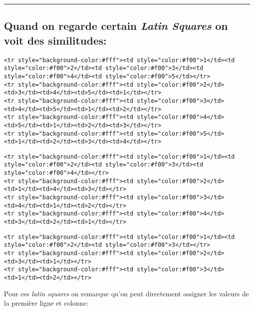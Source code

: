 \documentclass[11pt]{article}
\begin{document}
    \begin{center}\rule{0.5\linewidth}{\linethickness}\end{center}

    \subsection{\texorpdfstring{Quand on regarde certain \emph{Latin
Squares} on voit des
similitudes:}{Quand on regarde certain Latin Squares on voit des similitudes:}}\label{quand-on-regarde-certain-latin-squares-on-voit-des-similitudes}

    \begin{verbatim}
<tr style="background-color:#fff"><td style="color:#f00">1</td><td style="color:#f00">2</td><td style="color:#f00">3</td><td style="color:#f00">4</td><td style="color:#f00">5</td></tr>
<tr style="background-color:#fff"><td style="color:#f00">2</td><td>3</td><td>4</td><td>5</td><td>1</td></tr>
<tr style="background-color:#fff"><td style="color:#f00">3</td><td>4</td><td>5</td><td>1</td><td>2</td></tr>
<tr style="background-color:#fff"><td style="color:#f00">4</td><td>5</td><td>1</td><td>2</td><td>3</td></tr>
<tr style="background-color:#fff"><td style="color:#f00">5</td><td>1</td><td>2</td><td>3</td><td>4</td></tr>
\end{verbatim}

    \begin{verbatim}
<tr style="background-color:#fff"><td style="color:#f00">1</td><td style="color:#f00">2</td><td style="color:#f00">3</td><td style="color:#f00">4</td></tr>
<tr style="background-color:#fff"><td style="color:#f00">2</td><td>1</td><td>4</td><td>3</td></tr>
<tr style="background-color:#fff"><td style="color:#f00">3</td><td>4</td><td>1</td><td>2</td></tr>
<tr style="background-color:#fff"><td style="color:#f00">4</td><td>3</td><td>2</td><td>1</td></tr>
\end{verbatim}

    \begin{verbatim}
<tr style="background-color:#fff"><td style="color:#f00">1</td><td style="color:#f00">2</td><td style="color:#f00">3</td></tr>
<tr style="background-color:#fff"><td style="color:#f00">2</td><td>3</td><td>1</td></tr>
<tr style="background-color:#fff"><td style="color:#f00">3</td><td>1</td><td>2</td></tr>
\end{verbatim}

    Pour ces \emph{latin squares} on remarque qu'on peut directement
assigner les valeurs de la première ligne et colonne:
\end{document}
